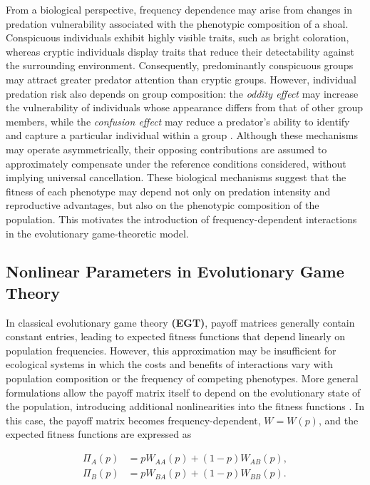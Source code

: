 From a biological perspective, frequency dependence may arise from changes in predation vulnerability associated with the phenotypic composition of a shoal. Conspicuous individuals exhibit highly visible traits, such as bright coloration, whereas cryptic individuals display traits that reduce their detectability against the surrounding environment. Consequently, predominantly conspicuous groups may attract greater predator attention than cryptic groups. However, individual predation risk also depends on group composition: the \textit{oddity effect} may increase the vulnerability of individuals whose appearance differs from that of other group members, while the \textit{confusion effect} may reduce a predator's ability to identify and capture a particular individual within a group \cite{rodgersMixedphenotypeGroupingInteraction2013}. Although these mechanisms may operate asymmetrically, their opposing contributions are assumed to approximately compensate under the reference conditions considered, without implying universal cancellation. These biological mechanisms suggest that the fitness of each phenotype may depend not only on predation intensity and reproductive advantages, but also on the phenotypic composition of the population. This motivates the introduction of frequency-dependent
interactions in the evolutionary game-theoretic model.\\ 


\subsection{Nonlinear Parameters in Evolutionary Game Theory}
\label{sec:nolinear}

In classical evolutionary game theory \textbf{(EGT)}, payoff matrices generally contain constant entries, leading to expected fitness functions that depend linearly on population frequencies. However, this approximation may be insufficient for ecological systems in which the costs and benefits of interactions vary with population composition or the frequency of competing phenotypes. More general formulations allow the payoff matrix itself to depend on the evolutionary state of the population, introducing additional nonlinearities into the fitness functions \cite{broomNonlinearMultiplayerEvolutionary2016}. In this case, the payoff matrix becomes frequency-dependent, \(W=W(p)\), and the expected fitness functions are expressed as 

\begin{equation}
\begin{aligned}
\Pi_A(p) &= pW_{AA}(p)+(1-p)W_{AB}(p),\\
\Pi_B(p) &= pW_{BA}(p)+(1-p)W_{BB}(p).
\end{aligned}
\end{equation}

